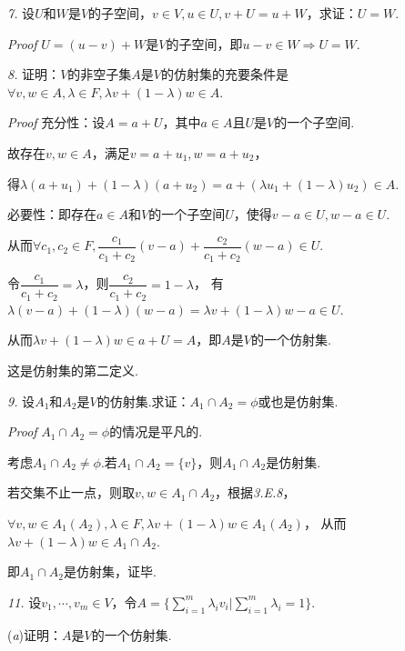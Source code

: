 \hspace*{\fill}

\textit{7.}
设\(U\)和\(W\)是\(V\)的子空间，\(v \in V,u \in U,v+U=u+W\)，求证：\(U=W\).

\textit{Proof}
\(U=(u-v)+W\)是\(V\)的子空间，即\(u-v \in W \Rightarrow U=W\).

\hspace*{\fill}

\textit{8.}
证明：\(V\)的非空子集\(A\)是\(V\)的仿射集的充要条件是\(\forall v,w \in A,\lambda \in F,\lambda v+(1- \lambda)w \in A\).

\textit{Proof}
充分性：设\(A=a+U\)，其中\(a\in A\)且\(U\)是\(V\)的一个子空间.

故存在\(v,w \in A\)，满足\(v=a+u_1,w=a+u_2\)，

得\(\lambda(a+u_1)+(1-\lambda)(a+u_2)=a+(\lambda u_1+(1-\lambda)u_2) \in A\).

必要性：即存在\(a \in A\)和\(V\)的一个子空间\(U\)，使得\(v-a \in U,w-a \in U\).

从而\(\forall c_1,c_2 \in F,\dfrac{c_1}{c_1+c_2}(v-a)+\dfrac{c_2}{c_1+c_2}(w-a) \in U\).

令\(\dfrac{c_1}{c_1+c_2}=\lambda\)，则\(\dfrac{c_2}{c_1+c_2}=1-\lambda\)，
有\(\lambda (v-a)+(1- \lambda)(w-a)=\lambda v+(1- \lambda)w-a \in U\).

从而\(\lambda v+(1- \lambda)w \in a+U=A\)，即\(A\)是\(V\)的一个仿射集.

这是仿射集的第二定义.

\newpage

\textit{9.}
设\(A_1\)和\(A_2\)是\(V\)的仿射集.求证：\(A_1 \cap A_2=\phi\)或也是仿射集.

\textit{Proof}
\(A_1 \cap A_2=\phi\)的情况是平凡的.

考虑\(A_1 \cap A_2 \ne \phi\).若\(A_1 \cap A_2=\{v\}\)，则\(A_1 \cap A_2\)是仿射集.

若交集不止一点，则取\(v,w \in A_1 \cap A_2\)，根据\textit{3.E.8}，

\(\forall v,w \in A_1(A_2),\lambda \in F,\lambda v+(1- \lambda)w \in A_1(A_2)\)，
从而\(\lambda v+(1- \lambda)w \in A_1 \cap A_2\).

即\(A_1 \cap A_2\)是仿射集，证毕.

\hspace*{\fill}

\textit{11.}
设\(v_1,\cdots,v_m \in V\)，令\(A=\{\sum_{i=1}^m \lambda_i v_i|\sum_{i=1}^m \lambda_i=1\}\).

(\textit{a})证明：\(A\)是\(V\)的一个仿射集.

